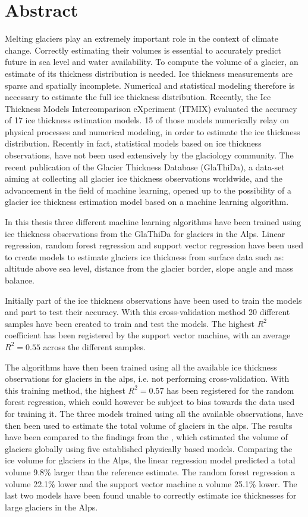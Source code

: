 \chapter*{Abstract}
\thispagestyle{plain}
Melting glaciers play an extremely important role in the context of climate change. Correctly estimating their volumes is essential to accurately predict future in sea level and water availability. To compute the volume of a glacier, an estimate of its thickness distribution is needed. Ice thickness measurements are sparse and spatially incomplete. Numerical and statistical modeling therefore is necessary to estimate the full ice thickness distribution. Recently, the Ice Thickness Models Intercomparison eXperiment (ITMIX) evaluated the accuracy of 17 ice thickness estimation models. 15 of those models numerically relay on physical processes and numerical modeling, in order to estimate the ice thickness distribution. Recently in fact, statistical models based on ice thickness observations, have not been used extensively by the glaciology community. The recent publication of the Glacier Thickness Database (GlaThiDa), a data-set aiming at collecting all glacier ice thickness observations worldwide, and the advancement in the field of machine learning, opened up to the possibility of a glacier ice thickness estimation model based on a machine learning algorithm.

In this thesis three different machine learning algorithms have been trained using ice thickness observations from the GlaThiDa for glaciers in the Alps. Linear regression, random forest regression and support vector regression have been used to create models to estimate glaciers ice thickness from surface data such as: altitude above sea level, distance from the glacier border, slope angle and mass balance.
 
Initially part of the ice thickness observations have been used to train the models and part to test their accuracy. With this cross-validation method 20 different samples have been created to train and test the models. The highest $R^2$ coefficient has been registered by the support vector machine, with an average $R^2=0.55$ across the different samples. 

The algorithms have then been trained using all the available ice thickness observations for glaciers in the alps, i.e. not performing cross-validation. With this training method, the highest $R^2=0.57$ has been registered for the random forest regression, which could however be subject to bias towards the data used for training it. The three models trained using all the available observations, have then been used to estimate the total volume of glaciers in the alps. The results have been compared to the findings from the \cite{Farinotti2019}, which estimated the volume of glaciers globally using five established physically based models. Comparing the ice volume for glaciers in the Alps, the linear regression model predicted a total volume 9.8\% larger than the reference estimate. The random forest regression a volume 22.1\% lower and the support vector machine a volume 25.1\% lower. The last two models have been found unable to correctly estimate ice thicknesses for large glaciers in the Alps.

